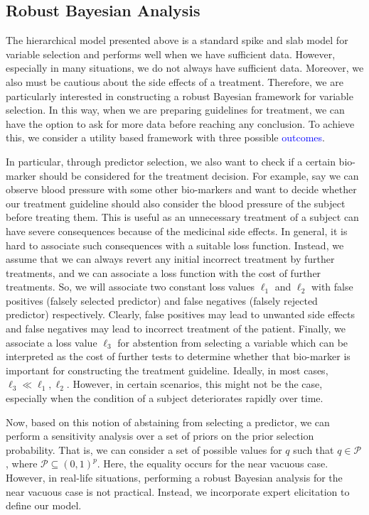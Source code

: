 \documentclass[preprint,12pt]{elsarticle}
\newcommand{\added}[1]{\textcolor{blue}{#1}}
\begin{document}
\subsection{Robust Bayesian Analysis}
\label{sec:robustbayesanalysis}

The hierarchical model presented above is a standard spike and slab model for
variable selection and performs well when we have sufficient data. 
However, especially in many situations, we do not always have sufficient data. Moreover, 
we also must be cautious about the side effects of a treatment.
Therefore, we are particularly interested in constructing a robust Bayesian framework
for variable selection. In this way, when we are preparing guidelines for treatment, we 
can have the option to ask for more data before reaching any conclusion. To achieve this,
we consider a utility based framework with three possible \added{outcomes}.

In particular, through predictor selection, we also want 
to check if a certain bio-marker should be considered
for the treatment decision. For example, say we can observe blood pressure with some
other bio-markers and want to decide whether our
treatment guideline should also consider the blood
pressure of the subject before treating them. This is
useful as an unnecessary treatment of a subject can have severe consequences because of the medicinal
side effects. In general, it is hard to associate such consequences 
with a suitable loss function. Instead, we
assume that we can always revert any initial incorrect treatment by further treatments, 
and we can associate a loss function with the cost of further treatments.
So, we will associate two constant loss values $\ell_1$ and $\ell_2$ 
with false positives (falsely selected predictor) and 
false negatives (falsely rejected predictor) respectively. 
Clearly, false positives may lead to unwanted side effects and
false negatives may lead to incorrect treatment of the patient. Finally, we associate
a loss value $\ell_3$ for abstention from selecting
a variable which can be interpreted as the cost of further tests to determine whether that bio-marker
is important for constructing the treatment guideline.
Ideally, in most cases, $\ell_3\ll \ell_1,\ell_2$. However, in certain scenarios,
this might not be the case, especially when the condition of a subject deteriorates rapidly
over time.

Now, based on this notion of abstaining from selecting a predictor, we can perform
a sensitivity analysis over a set of priors on the prior selection probability.
That is, we can consider a set of possible values for $q$ such that
$q\in\mathcal{P}$, where $\mathcal{P} \subseteq \left(0, 1\right)^{p}$.
Here, the equality occurs for the near vacuous case. However, in real-life
situations, performing a robust Bayesian analysis for the near vacuous case is 
not practical. Instead, we incorporate expert elicitation to define our model.
\end{document}
